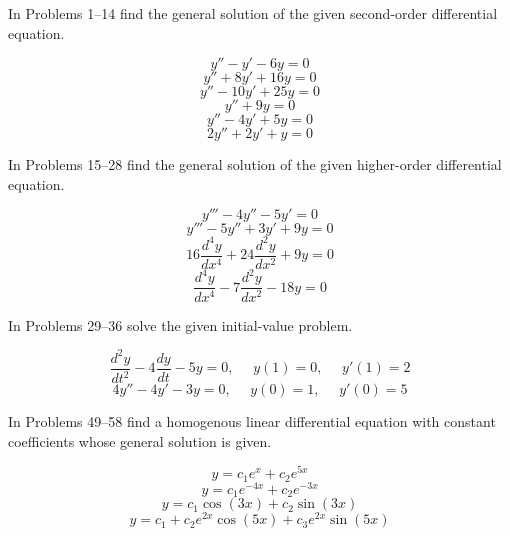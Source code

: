 \documentclass[12pt]{report}
\newcommand{\ivpsep}{\mbox{{ }{ }}}
\begin{document}

In Problems 1--14 find the general solution of the given second-order differential equation.
\begin{enumerate}[label=\arabic*.,start=3]
	 \[ y'' - y' - 6y = 0 \]				%
	\setcounter{enumi}{4}
	 \[ y'' + 8y' + 16y = 0 \]				%
	 \[ y'' - 10y' + 25y = 0 \]			%
	\setcounter{enumi}{8}
	 \[ y'' + 9y = 0 \] 					%
	\setcounter{enumi}{10}
	 \[ y'' - 4y' + 5y = 0 \] 				%
	 \[ 2y'' + 2y' + y = 0 \] 				%
\end{enumerate}

In Problems 15--28 find the general solution of the given higher-order differential equation.
\begin{enumerate}[label=\arabic*.,start=15]
	 \[ y''' - 4y'' - 5y' = 0 \]										%
	\setcounter{enumi}{16}
	 \[ y''' - 5y'' + 3y' + 9y = 0 \]									%
	\setcounter{enumi}{24}
	 \[ 16\frac{d^{4}y}{dx^{4}} + 24\frac{d^{2}y}{dx^{2}} + 9y = 0 \]	%
	 \[ \frac{d^{4}y}{dx^{4}} - 7\frac{d^{2}y}{dx^{2}} - 18y = 0 \]	%
\end{enumerate}

In Problems 29--36 solve the given initial-value problem.
\begin{enumerate}[label=\arabic*.,start=31]
	 \[ \frac{d^{2}y}{dt^{2}} - 4\frac{dy}{dt} - 5y = 0,\ivpsep y(1)=0,\ivpsep y'(1)=2 \]			%
	 \[ 4y'' - 4y' - 3y = 0,\ivpsep y(0)=1,\ivpsep y'(0)=5 \]										%
\end{enumerate}

In Problems 49--58 find a homogenous linear differential equation with constant coefficients whose general solution is given.
\begin{enumerate}[label=\arabic*.,start=49]
	 \[ y = c_{1}e^{x} + c_{2}e^{5x} \]							%
	 \[ y = c_{1}e^{-4x} + c_{2}e^{-3x} \]							%
	\setcounter{enumi}{52}
	 \[ y = c_{1}\cos(3x) + c_{2}\sin(3x) \]						%
	\setcounter{enumi}{55}
	 \[ y = c_{1} + c_{2}e^{2x}\cos(5x) + c_{3}e^{2x}\sin(5x) \]	%
\end{enumerate}
\end{document}
